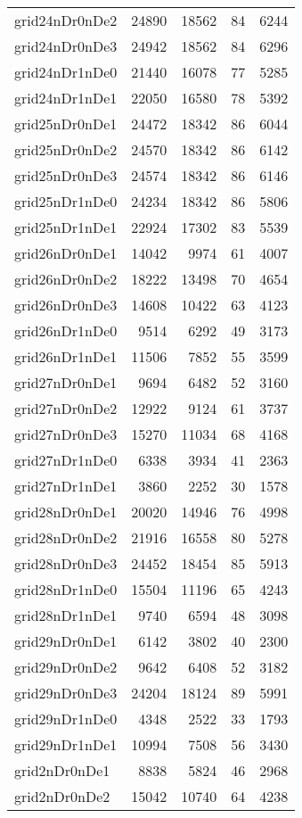 \begin{tabular}{lrrrr}
grid24nDr0nDe2 & 24890 & 18562 & 84 & 6244 \\
grid24nDr0nDe3 & 24942 & 18562 & 84 & 6296 \\
grid24nDr1nDe0 & 21440 & 16078 & 77 & 5285 \\
grid24nDr1nDe1 & 22050 & 16580 & 78 & 5392 \\
grid25nDr0nDe1 & 24472 & 18342 & 86 & 6044 \\
grid25nDr0nDe2 & 24570 & 18342 & 86 & 6142 \\
grid25nDr0nDe3 & 24574 & 18342 & 86 & 6146 \\
grid25nDr1nDe0 & 24234 & 18342 & 86 & 5806 \\
grid25nDr1nDe1 & 22924 & 17302 & 83 & 5539 \\
grid26nDr0nDe1 & 14042 & 9974 & 61 & 4007 \\
grid26nDr0nDe2 & 18222 & 13498 & 70 & 4654 \\
grid26nDr0nDe3 & 14608 & 10422 & 63 & 4123 \\
grid26nDr1nDe0 & 9514 & 6292 & 49 & 3173 \\
grid26nDr1nDe1 & 11506 & 7852 & 55 & 3599 \\
grid27nDr0nDe1 & 9694 & 6482 & 52 & 3160 \\
grid27nDr0nDe2 & 12922 & 9124 & 61 & 3737 \\
grid27nDr0nDe3 & 15270 & 11034 & 68 & 4168 \\
grid27nDr1nDe0 & 6338 & 3934 & 41 & 2363 \\
grid27nDr1nDe1 & 3860 & 2252 & 30 & 1578 \\
grid28nDr0nDe1 & 20020 & 14946 & 76 & 4998 \\
grid28nDr0nDe2 & 21916 & 16558 & 80 & 5278 \\
grid28nDr0nDe3 & 24452 & 18454 & 85 & 5913 \\
grid28nDr1nDe0 & 15504 & 11196 & 65 & 4243 \\
grid28nDr1nDe1 & 9740 & 6594 & 48 & 3098 \\
grid29nDr0nDe1 & 6142 & 3802 & 40 & 2300 \\
grid29nDr0nDe2 & 9642 & 6408 & 52 & 3182 \\
grid29nDr0nDe3 & 24204 & 18124 & 89 & 5991 \\
grid29nDr1nDe0 & 4348 & 2522 & 33 & 1793 \\
grid29nDr1nDe1 & 10994 & 7508 & 56 & 3430 \\
grid2nDr0nDe1 & 8838 & 5824 & 46 & 2968 \\
grid2nDr0nDe2 & 15042 & 10740 & 64 & 4238 \\

\end{tabular}
